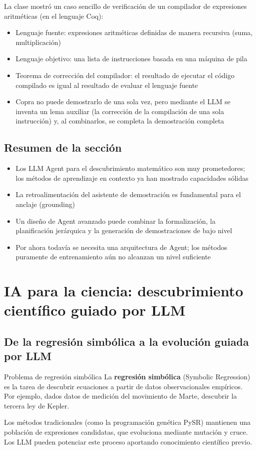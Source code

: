 \documentclass[a4paper]{article}
\begin{document}
La clase mostró un caso sencillo de verificación de un compilador de expresiones aritméticas (en el lenguaje Coq):
\begin{itemize}
    \item Lenguaje fuente: expresiones aritméticas definidas de manera recursiva (suma, multiplicación)
    \item Lenguaje objetivo: una lista de instrucciones basada en una máquina de pila
    \item Teorema de corrección del compilador: el resultado de ejecutar el código compilado es igual al resultado de evaluar el lenguaje fuente
    \item Copra no puede demostrarlo de una sola vez, pero mediante el LLM se inventa un lema auxiliar (la corrección de la compilación de una sola instrucción) y, al combinarlos, se completa la demostración completa
\end{itemize}

\subsection{Resumen de la sección}

\begin{itemize}
    \item Los LLM Agent para el descubrimiento matemático son muy prometedores; los métodos de aprendizaje en contexto ya han mostrado capacidades sólidas
    \item La retroalimentación del asistente de demostración es fundamental para el anclaje (grounding)
    \item Un diseño de Agent avanzado puede combinar la formalización, la planificación jerárquica y la generación de demostraciones de bajo nivel
    \item Por ahora todavía se necesita una arquitectura de Agent; los métodos puramente de entrenamiento aún no alcanzan un nivel suficiente
\end{itemize}
\section{IA para la ciencia: descubrimiento científico guiado por LLM}

\subsection{De la regresión simbólica a la evolución guiada por LLM}

\begin{knowledgebox}{Problema de regresión simbólica}
La \textbf{regresión simbólica} (Symbolic Regression) es la tarea de descubrir ecuaciones a partir de datos observacionales empíricos. Por ejemplo, dados datos de medición del movimiento de Marte, descubrir la tercera ley de Kepler.

Los métodos tradicionales (como la programación genética PySR) mantienen una población de expresiones candidatas, que evoluciona mediante mutación y cruce. Los LLM pueden potenciar este proceso aportando conocimiento científico previo.
\end{knowledgebox}
\end{document}
